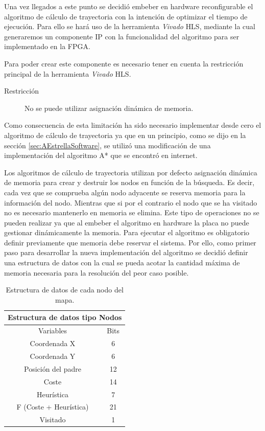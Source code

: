 Una vez llegados a este punto se decidió embeber en hardware reconfigurable el algoritmo de cálculo de trayectoria con la intención de optimizar el tiempo de ejecución. 
Para ello se hará uso de la herramienta \emph{Vivado} \ac{HLS}, mediante la cual generaremos un componente \ac{IP} con la funcionalidad del algoritmo para ser implementado en la FPGA.

Para poder crear este componente es necesario tener en cuenta la restricción principal de la herramienta \emph{Vivado} \ac{HLS}.

\begin{description}
\item [Restricción] No se puede utilizar asignación dinámica de memoria. 
\end{description}

Como consecuencia de esta limitación ha sido necesario implementar desde cero el algoritmo de cálculo de trayectoria ya que en un principio, como se dijo en la sección \ref{sec:AEstrellaSoftware}, se utilizó una modificación de una implementación del algoritmo A* que se encontró en internet. \cite{ImplementacionAlgoritmoA}

Los algoritmos de cálculo de trayectoria utilizan por defecto asignación dinámica de memoria para crear y destruir los nodos en función de la búsqueda. Es decir, cada vez que se comprueba algún nodo adyacente se reserva memoria para la información del nodo. Mientras que si por el contrario el nodo que se ha visitado no es necesario mantenerlo en memoria se elimina. Este tipo de operaciones no se pueden realizar ya que al embeber el algoritmo en hardware la placa no puede gestionar dinámicamente la memoria. Para ejecutar el algoritmo es obligatorio definir previamente que memoria debe reservar el sistema. Por ello, como primer paso para desarrollar la nueva implementación del algoritmo se decidió definir una estructura de datos con la cual se pueda acotar la  cantidad máxima de memoria necesaria para la resolución del peor caso posible.

\begin{table}[]
\centering
\begin{tabular}{|c|c|}
\hline
\multicolumn{2}{|c|}{\cellcolor[HTML]{9B9B9B}Estructura de datos tipo Nodos} \\ \hline
\rowcolor[HTML]{C0C0C0}
Variables & \multicolumn{1}{c|}{\cellcolor[HTML]{C0C0C0}Bits} \\ \hline
Coordenada X & 6 \\ \hline 
Coordenada Y & 6 \\ \hline
Posición del padre & 12 \\ \hline
Coste &  14     \\ \hline
Heurística & 7 \\ \hline
F (Coste + Heurística) & 21 \\ \hline
Visitado   & 1 \\ \hline
\end{tabular}
\caption{Estructura de datos de cada nodo del mapa.}
\label{tab:EstructuraNodos}
\end{table}

